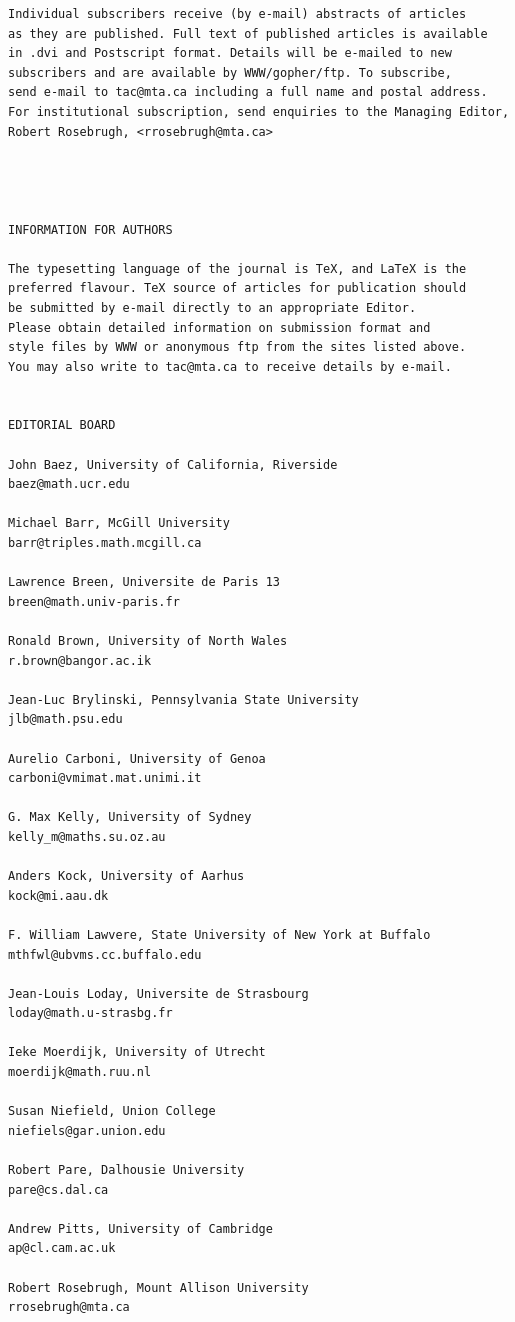 \documentclass[12pt]{article}
\begin{document}
\begin{verbatim}
Individual subscribers receive (by e-mail) abstracts of articles 
as they are published. Full text of published articles is available 
in .dvi and Postscript format. Details will be e-mailed to new 
subscribers and are available by WWW/gopher/ftp. To subscribe, 
send e-mail to tac@mta.ca including a full name and postal address. 
For institutional subscription, send enquiries to the Managing Editor, 
Robert Rosebrugh, <rrosebrugh@mta.ca>
 
 
 
 
INFORMATION FOR AUTHORS
 
The typesetting language of the journal is TeX, and LaTeX is the 
preferred flavour. TeX source of articles for publication should 
be submitted by e-mail directly to an appropriate Editor. 
Please obtain detailed information on submission format and 
style files by WWW or anonymous ftp from the sites listed above.
You may also write to tac@mta.ca to receive details by e-mail.
 
 
EDITORIAL BOARD
 
John Baez, University of California, Riverside
baez@math.ucr.edu
 
Michael Barr, McGill University
barr@triples.math.mcgill.ca
 
Lawrence Breen, Universite de Paris 13
breen@math.univ-paris.fr
 
Ronald Brown, University of North Wales 
r.brown@bangor.ac.ik
 
Jean-Luc Brylinski, Pennsylvania State University
jlb@math.psu.edu
 
Aurelio Carboni, University of Genoa
carboni@vmimat.mat.unimi.it
 
G. Max Kelly, University of Sydney
kelly_m@maths.su.oz.au
 
Anders Kock, University of Aarhus
kock@mi.aau.dk
 
F. William Lawvere, State University of New York at Buffalo
mthfwl@ubvms.cc.buffalo.edu
 
Jean-Louis Loday, Universite de Strasbourg
loday@math.u-strasbg.fr
 
Ieke Moerdijk, University of Utrecht
moerdijk@math.ruu.nl
 
Susan Niefield, Union College
niefiels@gar.union.edu
 
Robert Pare, Dalhousie University
pare@cs.dal.ca
 
Andrew Pitts, University of Cambridge
ap@cl.cam.ac.uk
 
Robert Rosebrugh, Mount Allison University
rrosebrugh@mta.ca
 

\end{verbatim}
\end{document}
